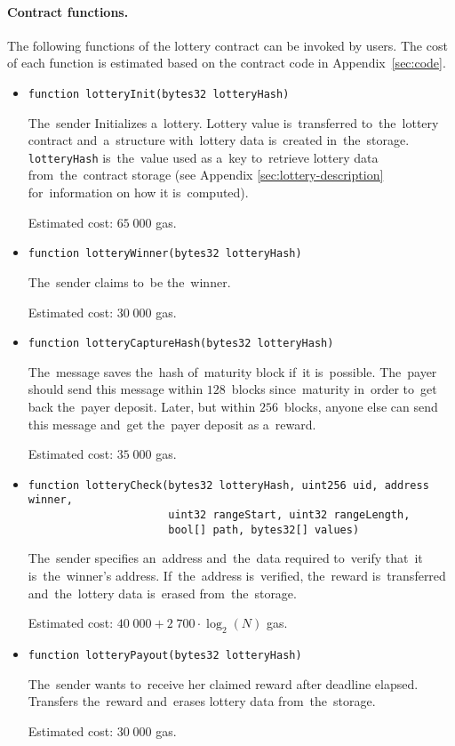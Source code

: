 \documentclass[a4paper]{article}
\begin{document}
    \paragraph{Contract functions.} The following functions of the lottery contract can be invoked by users.
    The cost of each function is estimated based on the contract code in Appendix~\ref{sec:code}.

    \begin{itemize}
        \item \verb!function lotteryInit(bytes32 lotteryHash)!

            The~sender Initializes a~lottery. Lottery value is~transferred to~the~lottery contract and~a~structure
            with~lottery data is~created in~the~storage. \texttt{lotteryHash} is~the~value used as a~key to~retrieve
            lottery data from~the~contract storage (see Appendix \ref{sec:lottery-description} for~information on how it
            is~computed). 

            Estimated cost: $65\;000$ gas.

        \item \verb!function lotteryWinner(bytes32 lotteryHash)!

            The~sender claims to~be the~winner.

            Estimated cost: $30\;000$ gas.

        \item \verb!function lotteryCaptureHash(bytes32 lotteryHash)!

            The~message saves the~hash of~maturity block if~it is~possible. The~payer should send this message
            within $128$~blocks since~maturity in~order to~get back the~payer deposit.
            Later, but within $256$~blocks, anyone else can send this message and~get the~payer deposit as a~reward.

            Estimated cost: $35\;000$ gas.
            
        \item{} \verb!function lotteryCheck(bytes32 lotteryHash, uint256 uid, address winner,!\\
                \verb!                      uint32 rangeStart, uint32 rangeLength,!\\
                \verb!                      bool[] path, bytes32[] values)!
          
            The~sender specifies an~address and~the~data required to~verify that~it is~the~winner's address.
            If~the~address is~verified, the~reward is~transferred and~the~lottery data is~erased from~the~storage.

            Estimated cost: $40\;000 + 2\;700 \cdot \log_2(N)$ gas.

        \item \verb!function lotteryPayout(bytes32 lotteryHash)!

            The~sender wants to~receive her claimed reward after deadline elapsed. Transfers the~reward and~erases
            lottery data from~the~storage.

            Estimated cost: $30\;000$ gas.

    \end{itemize}
\end{document}
